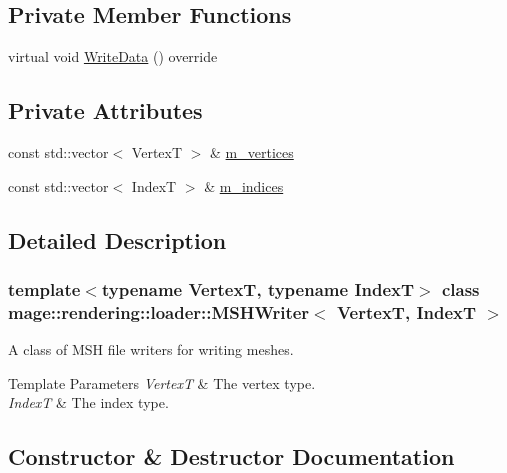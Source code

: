 \subsection*{Private Member Functions}
\begin{DoxyCompactItemize}
\item 
virtual void \hyperlink{classmage_1_1rendering_1_1loader_1_1_m_s_h_writer_ad61ee7097e1bfb52ca9a0697d2cd6a7e}{Write\+Data} () override
\end{DoxyCompactItemize}
\subsection*{Private Attributes}
\begin{DoxyCompactItemize}
\item 
const std\+::vector$<$ VertexT $>$ \& \hyperlink{classmage_1_1rendering_1_1loader_1_1_m_s_h_writer_adf2b47491fdda0077ba3bf1053f343d0}{m\+\_\+vertices}
\item 
const std\+::vector$<$ IndexT $>$ \& \hyperlink{classmage_1_1rendering_1_1loader_1_1_m_s_h_writer_a7de7ca864e3a3a384bf7c98997146748}{m\+\_\+indices}
\end{DoxyCompactItemize}


\subsection{Detailed Description}
\subsubsection*{template$<$typename VertexT, typename IndexT$>$\newline
class mage\+::rendering\+::loader\+::\+M\+S\+H\+Writer$<$ Vertex\+T, Index\+T $>$}

A class of M\+SH file writers for writing meshes.


\begin{DoxyTemplParams}{Template Parameters}
{\em VertexT} & The vertex type. \\
\hline
{\em IndexT} & The index type. \\
\hline
\end{DoxyTemplParams}


\subsection{Constructor \& Destructor Documentation}
\hypertarget{classmage_1_1rendering_1_1loader_1_1_m_s_h_writer_a5e1a7ed8ca94f157f52bba929cac2fd3}{}\label{classmage_1_1rendering_1_1loader_1_1_m_s_h_writer_a5e1a7ed8ca94f157f52bba929cac2fd3} 
